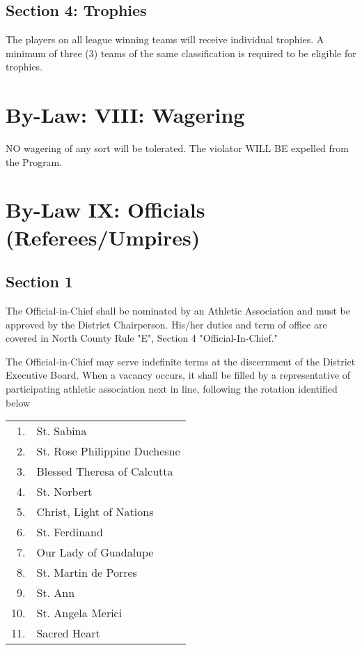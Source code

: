 \documentclass[draft]{memoir}
\begin{document}
\subsection{Section 4: Trophies}
The players on all league winning teams will receive individual trophies.  A minimum of three (3) teams of the same classification is required to be eligible for trophies.

\section{By-Law: VIII: Wagering}
NO wagering of any sort will be tolerated. The violator WILL BE expelled from the Program.

\section{By-Law IX: Officials (Referees/Umpires)}
\subsection{Section 1}
The Official-in-Chief shall be nominated by an Athletic Association and must be approved by the District Chairperson.  His/her duties and term of office are covered in North County Rule "E", Section 4 "Official-In-Chief."

The Official-in-Chief may serve indefinite terms at the discernment of the District Executive Board. When a vacancy occurs, it shall be filled by a representative of participating athletic association next in line, following the rotation identified below

\begin{center}
    \begin{tabular}{ r l }
        1. & St. Sabina \\
        2. & St. Rose Philippine Duchesne \\
        3. & Blessed Theresa of Calcutta \\
        4. & St. Norbert \\
        5. & Christ, Light of Nations \\
        6. & St. Ferdinand \\
        7. & Our Lady of Guadalupe \\
        8. & St. Martin de Porres \\
        9. & St. Ann \\
        10. & St. Angela Merici \\
        11. & Sacred Heart \\
    \end{tabular}
\end{center}
\end{document}
